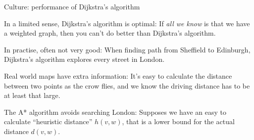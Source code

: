 \documentclass{beamer}
\begin{document}
\begin{frame}{Culture: performance of Dijkstra's algorithm}
  \begin{block}{In a limited sense, Dijkstra's algorithm is optimal:}
If \emph{all we know} is that we have a weighted graph, then you can't do better than Dijkstra's algorithm.
    \end{block}
  \begin{block}{In practise, often not very good:}
 When finding path from Sheffield to Edinburgh, Dijkstra's algorithm explores every street in London.
  \end{block}
  \begin{block}{Real world maps have extra information:}
    It's easy to calculate the distance between two points as the crow flies, and we know the driving distance has to be at least that large.  
\end{block}  
  \begin{block}{The A* algorithm avoids searching London:}
    Supposes we have an easy to calculate ``heuristic distance'' $h(v,w)$, that is a lower bound for the actual distance $d(v,w)$. 
    \end{block}
\end{frame}
\end{document}
